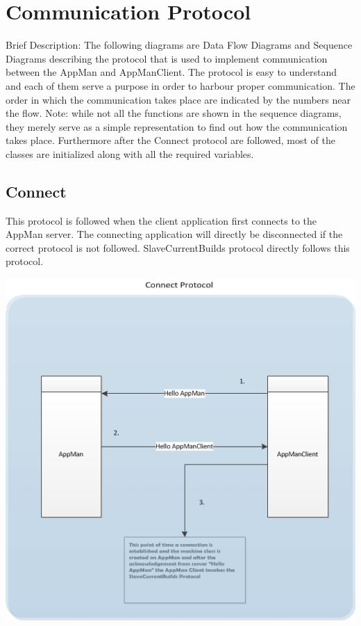\documentclass[a4paper,12pt,final]{article}
\begin{document}
\section{Communication Protocol}
Brief Description: The following diagrams are Data Flow Diagrams and Sequence Diagrams describing the protocol that is used to implement communication between the AppMan and AppManClient. The protocol is easy to understand and each of them serve a purpose in order to harbour proper communication. The order in which the communication takes place are indicated by the numbers near the flow.
\vspace{12pt}\newline
Note: while not all the functions are shown in the sequence diagrams, they merely serve as a simple representation to find out how the communication takes place. Furthermore after the Connect protocol are followed, most of the classes are initialized along with all the required variables.

\subsection{Connect}
This protocol is followed when the client application first connects to the AppMan server. The connecting application will directly be disconnected if the correct protocol is not followed. SlaveCurrentBuilds protocol directly follows this protocol.
\begin{center}
\includegraphics[scale=1.0]{CommunicationProtocol/ConnectProtocol.jpg} 
\end{center}
\end{document}
